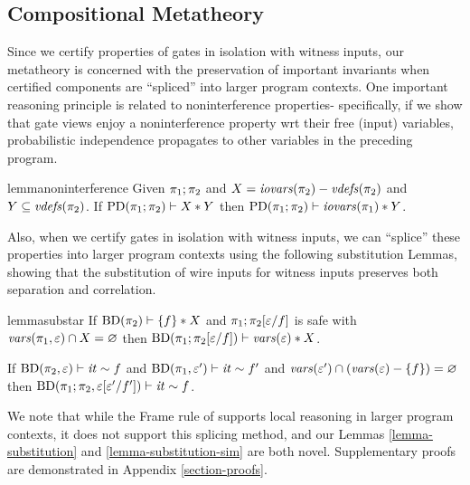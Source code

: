 \subsection{Compositional Metatheory}

Since we certify properties of gates in isolation with witness inputs,
our metatheory is concerned with the preservation of important invariants
when certified components are ``spliced'' into larger program
contexts.  One important reasoning principle is related to
noninterference properties- specifically, if we show that gate views
enjoy a noninterference property wrt their free (input) variables,
probabilistic independence propagates to other variables in the
preceding program.
\begin{restatable}[Noninterference]{lemma}{noninterference}
  \label{lemma-noninterference}
  Given $\pi_1;\pi_2$ and $X = \mathit{iovars}(\pi_2) - \mathit{vdefs}(\pi_2)$ and
  $Y \subseteq \mathit{vdefs}(\pi_2)$. If $\mathrm{PD}(\pi_1;\pi_2) \vdash X * Y$
  then $\mathrm{PD}(\pi_1;\pi_2) \vdash \mathit{iovars}(\pi_1) * Y$.
\end{restatable}

Also, when we certify gates in isolation with witness inputs, we can
``splice'' these properties into larger program contexts using the
following substitution Lemmas, showing that the substitution of
wire inputs for witness inputs preserves both separation and correlation.
\begin{restatable}[Substitution$*$]{lemma}{substar}
  \label{lemma-substitution}
  If $\mathrm{BD}(\pi_2) \vdash \{ f \} * X$ and
  $\pi_1;\pi_2[\varepsilon/f]$ is safe with $\mathit{vars}(\pi_1,\varepsilon) \cap
  X = \varnothing$ then
  $\mathrm{BD}(\pi_1;\pi_2[\varepsilon/f]) \vdash \mathit{vars}(\varepsilon) * X$.
\end{restatable}

\begin{lemma}
  \label{lemma-substitution-sim}
  If $\mathrm{BD}(\pi_2,\varepsilon) \vdash \mathit{it} \sim f$ and $\mathrm{BD}(\pi_1,\varepsilon') \vdash \mathit{it} \sim f'$
  and $\mathit{vars}(\varepsilon') \cap (\mathit{vars}(\varepsilon) - \{ f \}) = \varnothing$
  then $\mathrm{BD}(\pi_1;\pi_2,\varepsilon[\varepsilon'/f']) \vdash \mathit{it} \sim f$.
\end{lemma}

We note that while the Frame rule of \cite{barthe2019probabilistic}
supports local reasoning in larger program contexts, it does not
support this splicing method, and our Lemmas \ref{lemma-substitution}
and \ref{lemma-substitution-sim} are both novel. Supplementary proofs
are demonstrated in Appendix \ref{section-proofs}.

